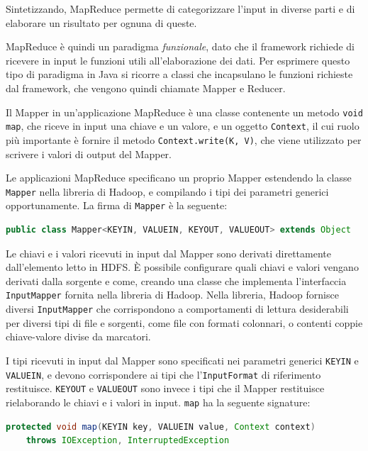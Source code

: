\documentclass[italian,a4paper, twoside, 12pt]{report}
\begin{document}
Sintetizzando, MapReduce permette di categorizzare l'input in diverse
parti e di elaborare un risultato per ognuna di queste.

MapReduce è quindi un paradigma \emph{funzionale}, dato che il framework
richiede di ricevere in input le funzioni utili all'elaborazione dei
dati. Per esprimere questo tipo di paradigma in Java si ricorre a classi
che incapsulano le funzioni richieste dal framework, che vengono quindi
chiamate Mapper e Reducer.

Il Mapper in un'applicazione MapReduce è una classe contenente un metodo
\lstinline!void map!, che riceve in input una chiave e un valore, e un
oggetto \lstinline!Context!, il cui ruolo più importante è fornire il
metodo \lstinline!Context.write(K, V)!, che viene utilizzato per
scrivere i valori di output del Mapper.

Le applicazioni MapReduce specificano un proprio Mapper estendendo la
classe \lstinline!Mapper! nella libreria di Hadoop, e compilando i tipi
dei parametri generici opportunamente. La firma di \lstinline!Mapper! è
la seguente:

\begin{lstlisting}[language=Java]
public class Mapper<KEYIN, VALUEIN, KEYOUT, VALUEOUT> extends Object
\end{lstlisting}

Le chiavi e i valori ricevuti in input dal Mapper sono derivati
direttamente dall'elemento letto in HDFS. È possibile configurare quali
chiavi e valori vengano derivati dalla sorgente e come, creando una
classe che implementa l'interfaccia \lstinline!InputMapper! fornita
nella libreria di Hadoop. Nella libreria, Hadoop fornisce diversi
\lstinline!InputMapper! che corrispondono a comportamenti di lettura
desiderabili per diversi tipi di file e sorgenti, come file con formati
colonnari, o contenti coppie chiave-valore divise da marcatori.

I tipi ricevuti in input dal Mapper sono specificati nei parametri
generici \lstinline!KEYIN! e \lstinline!VALUEIN!, e devono corrispondere
ai tipi che l'\lstinline!InputFormat! di riferimento restituisce.
\lstinline!KEYOUT! e \lstinline!VALUEOUT! sono invece i tipi che il
Mapper restituisce rielaborando le chiavi e i valori in input.
\lstinline!map! ha la seguente signature:

\begin{lstlisting}[language=Java]
protected void map(KEYIN key, VALUEIN value, Context context) 
    throws IOException, InterruptedException
\end{lstlisting}
\end{document}
